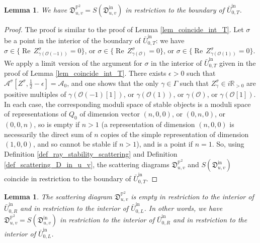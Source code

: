 \documentclass[12pt, a4paper]{amsart}
\newtheorem{lem}[defn]{Lemma}
\newcommand\PP{\mathbb P}
\newcommand\R{\mathbb R}
\newcommand\cA{\mathcal A}
\newcommand\cO{\mathcal O}
\newcommand\fD{\mathfrak D}
\newcommand\Rea{\operatorname{Re}\,}
\newcommand\iin{\mathrm{in}}
\begin{document}
\begin{lem}\label{lem_coincide_bound_T}
We have $\fD^{\PP^2}_{u,v}=S(\fD_{u,v}^\iin)$
in restriction to the boundary of 
$\bar{U}^\iin_{0,T}$.
\end{lem}

\begin{proof}
The proof is similar to the proof of Lemma
\ref{lem_coincide_int_T}.
Let $\sigma$ be a point in the interior of the boundary of $\bar{U}^\iin_{0,T}$: we have $\sigma \in \{\Rea Z^\sigma_{\gamma(\cO(-1))}=0\}$, or
$\sigma \in \{ \Rea Z^\sigma_{\gamma(\cO)}
=0\}$, or 
$\sigma \in \{ \Rea Z^\sigma_{\gamma(\cO(1))}=0\}$.
We apply a limit version of the argument for
$\sigma$ in the interior of 
$\bar{U}^\iin_{0,T}$
given in the proof of Lemma 
\ref{lem_coincide_int_T}. 
There exists 
$\epsilon >0$ such that 
$\cA^\sigma[Z^\sigma,\frac{1}{2}-\epsilon]=
\cA_0$, and one shows that the only $\gamma \in \Gamma$ such that $Z_\gamma^\sigma \in i \R_{>0}$ are positive multiples of 
$\gamma(\cO(-1)[1])$, or $\gamma(\cO(1))$, 
or $\gamma(\cO)$, or $\gamma(\cO[1])$. 
In each case, the corresponding moduli space of stable objects is a moduli space 
of representations of $Q_0$ of dimension vector $(n,0,0)$, or $(0,n,0)$, or 
$(0,0,n)$, so is empty if $n>1$
(a representation of dimension $(n,0,0)$ is 
necessarily the direct sum of $n$ copies of the simple representation of dimension $(1,0,0)$, and so cannot be stable if $n>1$), and is a point if $n=1$.
So, using Definition 
\ref{def_ray_stability_scattering}
and Definition \ref{def_scattering_D_in_u_v},
the scattering diagrams $\fD^{\PP^2}_{u,v}$ and $S(\fD^\iin_{u,v})$ coincide in restriction to the boundary of 
$\bar{U}^\iin_{0,T}$.
\end{proof}

\begin{lem}\label{lem_coincide_int_R}
The scattering diagram
$\fD^{\PP^2}_{u,v}$ is empty in restriction to the interior of 
$\bar{U}^\iin_{0,R}$ and in restriction to the interior of
$\bar{U}^\iin_{0,L}$.
In other words, we have 
$\fD^{\PP^2}_{u,v}
=S(\fD^\iin_{u,v})$ in restriction to the interior of 
$\bar{U}^\iin_{0,R}$ and in restriction to the interior of 
$\bar{U}^\iin_{0,L}$. 
\end{lem}
\end{document}
